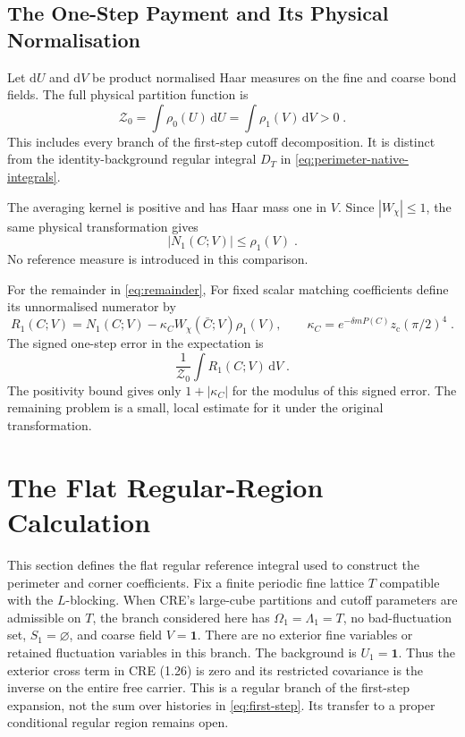 \documentclass[11pt]{article}
\newcommand{\dd}{\mathrm{d}}
\newcommand{\id}{\mathbf 1}
\begin{document}
\subsection{The One-Step Payment and Its Physical Normalisation}
\label{sec:one-step-payment}

Let $\dd U$ and $\dd V$ be product normalised Haar measures on the fine and coarse bond fields. The full physical partition function is
\begin{equation}\label{eq:one-step-physical-partition}
    \mathcal Z_0=\int\rho_0(U)\,\dd U
        =\int\rho_1(V)\,\dd V>0\;.
\end{equation}
This includes every branch of the first-step cutoff decomposition. It is distinct from the identity-background regular integral $D_T$ in \eqref{eq:perimeter-native-integrals}.

The averaging kernel is positive and has Haar mass one in $V$. Since $|W_\chi|\leq 1$, the same physical transformation gives
\begin{equation}\label{eq:one-step-physical-source-payment}
    |N_1(C;V)|\leq \rho_1(V)\;. 
\end{equation}
No reference measure is introduced in this comparison.

For the remainder in \eqref{eq:remainder}, For fixed scalar matching coefficients define its unnormalised numerator by
\begin{equation}\label{eq:one-step-physical-remainder}
    R_1(C;V)=N_1(C;V)
        -\kappa_CW_\chi(\bar C;V)\rho_1(V),
    \qquad
    \kappa_C=e^{-\delta mP(C)}z_{\mathrm c}(\pi/2)^4\;.
\end{equation}
The signed one-step error in the expectation is
\begin{equation}\label{eq:one-step-signed-remainder}
    \frac{1}{\mathcal Z_0}\int R_1(C;V)\,\dd V\;.
\end{equation}
The positivity bound gives only $1+|\kappa_C|$ for the modulus of this signed error. The remaining problem is a small, local estimate for it under the original transformation.

\section{The Flat Regular-Region Calculation}
\label{sec:flat}

This section defines the flat regular reference integral used to construct the perimeter and corner coefficients. Fix a finite periodic fine lattice $T$ compatible with the $L$-blocking. When CRE's large-cube partitions and cutoff parameters are admissible on $T$, the branch considered here has $\Omega_1=\Lambda_1=T$, no bad-fluctuation set, $S_1=\varnothing$, and coarse field $V=\id$. There are no exterior fine variables or retained fluctuation variables in this branch. The background is $U_1=\id$. Thus the exterior cross term in CRE (1.26) is zero and its restricted covariance is the inverse on the entire free carrier. This is a regular branch of the first-step expansion, not the sum over histories in \eqref{eq:first-step}. Its transfer to a proper conditional regular region remains open.
\end{document}
